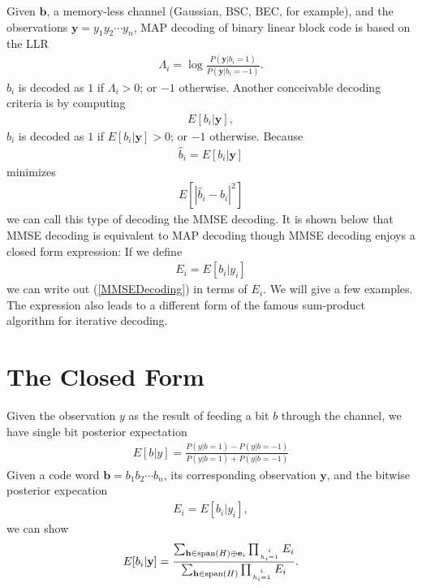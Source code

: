 \documentclass[12pt]{article}
\newcommand{\vect}[1]{\mathbf{#1}}
\begin{document}
Given $\vect{b}$, a memory-less channel (Gaussian, BSC, BEC, for example), and the observations $\vect{y}=y_1y_2\cdots y_n$, MAP decoding of binary linear block code is based on the LLR
\begin{align}
\Lambda_i = \log \frac{P(\vect{y}|b_i=1)}{P(\vect{y}|b_i=-1)}.
\end{align}
$b_i$ is decoded as $1$ if $\Lambda_i>0$; or $-1$ otherwise. Another conceivable decoding criteria is by computing
\begin{align}
E[b_i|\vect{y}],  \label{MMSEDecoding}
\end{align}
$b_i$ is decoded as $1$ if $E[b_i|\vect{y}]>0$; or $-1$ otherwise. Because
\begin{align}
\hat{b}_i = E[b_i|\vect{y}]
\end{align}
minimizes
\begin{align*}
E[|\hat{b}_i-b_i|^2]
\end{align*}
we can call this type of decoding the MMSE decoding. It is shown below that MMSE decoding is equivalent to MAP decoding though MMSE decoding enjoys a closed form expression: If we define
\begin{align}
E_i = E[b_i|y_i]
\end{align}
we can write out (\ref{MMSEDecoding}) in terms of $E_i$. We will give a few examples. The expression also leads to a different form of the famous sum-product algorithm for iterative decoding.

\section{The Closed Form}
Given the observation $y$ as the result of feeding a bit $b$ through the channel, we have single bit posterior expectation
\begin{align}
E[b|y] = \frac{P(y|b=1)-P(y|b=-1)}{P(y|b=1)+P(y|b=-1)} \label{single_observation_mmse}
\end{align}
Given a code word $\vect{b} = b_1b_2\cdots b_n$, its corresponding observation $\vect{y}$, and the bitwise posterior expecation
\begin{align}
E_i = E[b_i|y_i],
\end{align}
we can show
\begin{align}
E[b_i|\vect{y}] = \frac{\sum_{\vect{h}\in \mathrm{span} (H)\oplus \vect{e}_i}\prod_{i\atop h_i=1}E_i}{\sum_{\vect{h}\in \mathrm{span} (H)}\prod_{i\atop h_i=1}E_i}.
\end{align}
\end{document}
